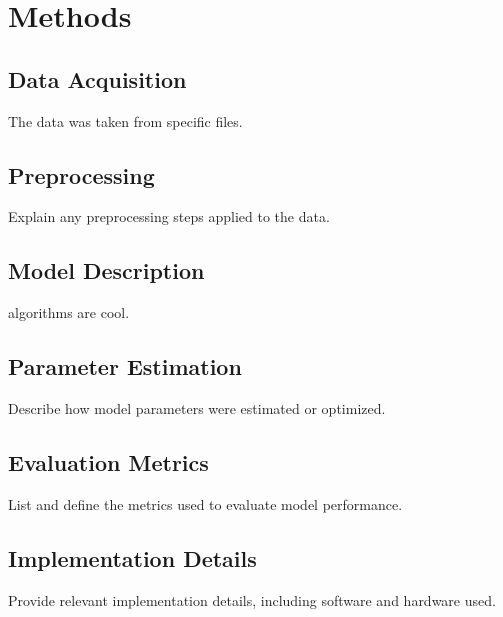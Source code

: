 \section{Methods}
\label{sec:methods}

\subsection{Data Acquisition}
The data was taken from specific files.

\subsection{Preprocessing}
Explain any preprocessing steps applied to the data.

\subsection{Model Description}
algorithms are cool.

\subsection{Parameter Estimation}
Describe how model parameters were estimated or optimized.

\subsection{Evaluation Metrics}
List and define the metrics used to evaluate model performance.

\subsection{Implementation Details}
Provide relevant implementation details, including software and hardware used.